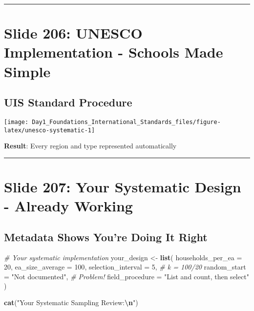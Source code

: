 \documentclass[
]{article}
\newenvironment{Shaded}{\begin{snugshade}}{\end{snugshade}}
\newcommand{\AttributeTok}[1]{\textcolor[rgb]{0.13,0.29,0.53}{#1}}
\newcommand{\CommentTok}[1]{\textcolor[rgb]{0.56,0.35,0.01}{\textit{#1}}}
\newcommand{\DecValTok}[1]{\textcolor[rgb]{0.00,0.00,0.81}{#1}}
\newcommand{\FunctionTok}[1]{\textcolor[rgb]{0.13,0.29,0.53}{\textbf{#1}}}
\newcommand{\NormalTok}[1]{#1}
\newcommand{\OtherTok}[1]{\textcolor[rgb]{0.56,0.35,0.01}{#1}}
\newcommand{\SpecialCharTok}[1]{\textcolor[rgb]{0.81,0.36,0.00}{\textbf{#1}}}
\newcommand{\StringTok}[1]{\textcolor[rgb]{0.31,0.60,0.02}{#1}}
\begin{document}
\begin{center}\rule{0.5\linewidth}{0.5pt}\end{center}

\section{Slide 206: UNESCO Implementation - Schools Made
Simple}\label{slide-206-unesco-implementation---schools-made-simple}

\subsection{UIS Standard Procedure}\label{uis-standard-procedure}

\texttt{[image: Day1\_Foundations\_International\_Standards\_files/figure-latex/unesco-systematic-1]}

\textbf{Result}: Every region and type represented automatically

\begin{center}\rule{0.5\linewidth}{0.5pt}\end{center}

\section{Slide 207: Your Systematic Design - Already
Working}\label{slide-207-your-systematic-design---already-working}

\subsection{Metadata Shows You're Doing It
Right}\label{metadata-shows-youre-doing-it-right}

\begin{Shaded}
\begin{Highlighting}[]
\CommentTok{\# Your systematic implementation}
\NormalTok{your\_design }\OtherTok{\textless{}{-}} \FunctionTok{list}\NormalTok{(}
  \AttributeTok{households\_per\_ea =} \DecValTok{20}\NormalTok{,}
  \AttributeTok{ea\_size\_average =} \DecValTok{100}\NormalTok{,}
  \AttributeTok{selection\_interval =} \DecValTok{5}\NormalTok{,  }\CommentTok{\# k = 100/20}
  \AttributeTok{random\_start =} \StringTok{"Not documented"}\NormalTok{,  }\CommentTok{\# Problem!}
  \AttributeTok{field\_procedure =} \StringTok{"List and count, then select"}
\NormalTok{)}

\FunctionTok{cat}\NormalTok{(}\StringTok{"Your Systematic Sampling Review:}\SpecialCharTok{\textbackslash{}n}\StringTok{"}\NormalTok{)}
\end{Highlighting}
\end{Shaded}
\end{document}
